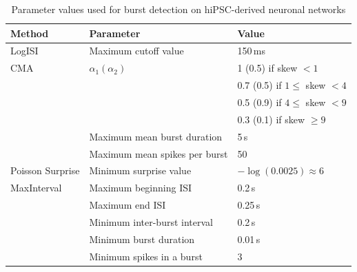 \documentclass[12pt, titlepage]{article}
\begin{document}
		\begin{table}[h]
			\centering
			\begin{tabular}{|l|l|l|}
				\hline
				Method & Parameter & Value
				\\ \hline 
				\rowcolor{Gray} LogISI & Maximum cutoff value & 150$\,$ms
				\\ \hline
				CMA & $\alpha_1 (\alpha_2)$ & 1 (0.5) if skew $<1$
				\\ & &  0.7 (0.5) if $1 \leq $ skew $<4$
				\\ & & 0.5 (0.9) if $4 \leq $ skew $<9$
				\\ & & 0.3 (0.1) if  skew $\geq 9$
				\\ & Maximum mean burst duration & 5$\,$s
				\\ & Maximum mean spikes per burst & 50
				\\ \hline 
				\rowcolor{Gray} Poisson Surprise  & Minimum surprise value & $-\log(0.0025) \approx 6$\\ \hline 
				MaxInterval & Maximum beginning ISI & 0.2$\,$s
				\\ & Maximum end ISI & 0.25$\,$s
				\\ & Minimum inter-burst interval & 0.2$\,$s
				\\ & Minimum burst duration & 0.01$\,$s
				\\ & Minimum spikes in a burst & 3
				\\ \hline
			\end{tabular}
			\caption{Parameter values used for burst detection on hiPSC-derived neuronal networks}
			\label{param_vals_hum}
		\end{table}
\end{document}
